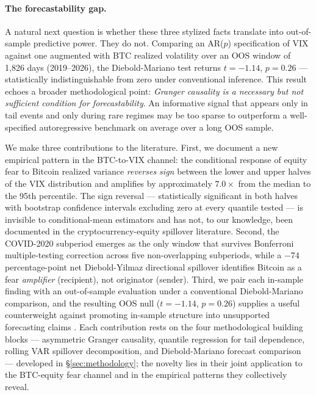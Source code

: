 \documentclass[11pt,a4paper]{article}
\begin{document}
\paragraph{The forecastability gap.} A natural next question is whether these three stylized facts translate into out-of-sample predictive power. They do not. Comparing an AR($p$) specification of VIX against one augmented with BTC realized volatility over an OOS window of 1,826 days (2019--2026), the Diebold-Mariano test returns $t = -1.14$, $p = 0.26$ --- statistically indistinguishable from zero under conventional inference. This result echoes a broader methodological point: \emph{Granger causality is a necessary but not sufficient condition for forecastability}. An informative signal that appears only in tail events and only during rare regimes may be too sparse to outperform a well-specified autoregressive benchmark on average over a long OOS sample.

We make three contributions to the literature. First, we document a new empirical pattern in the BTC-to-VIX channel: the conditional response of equity fear to Bitcoin realized variance \emph{reverses sign} between the lower and upper halves of the VIX distribution and amplifies by approximately $7.0\times$ from the median to the 95th percentile. The sign reversal --- statistically significant in both halves with bootstrap confidence intervals excluding zero at every quantile tested --- is invisible to conditional-mean estimators and has not, to our knowledge, been documented in the cryptocurrency-equity spillover literature. Second, the COVID-2020 subperiod emerges as the only window that survives Bonferroni multiple-testing correction across five non-overlapping subperiods, while a $-74$ percentage-point net Diebold-Yilmaz directional spillover identifies Bitcoin as a fear \emph{amplifier} (recipient), not originator (sender). Third, we pair each in-sample finding with an out-of-sample evaluation under a conventional Diebold-Mariano comparison, and the resulting OOS null ($t = -1.14$, $p = 0.26$) supplies a useful counterweight against promoting in-sample structure into unsupported forecasting claims \citep{conrad2020}. Each contribution rests on the four methodological building blocks --- asymmetric Granger causality, quantile regression for tail dependence, rolling VAR spillover decomposition, and Diebold-Mariano forecast comparison --- developed in \S\ref{sec:methodology}; the novelty lies in their joint application to the BTC-equity fear channel and in the empirical patterns they collectively reveal.
\end{document}
